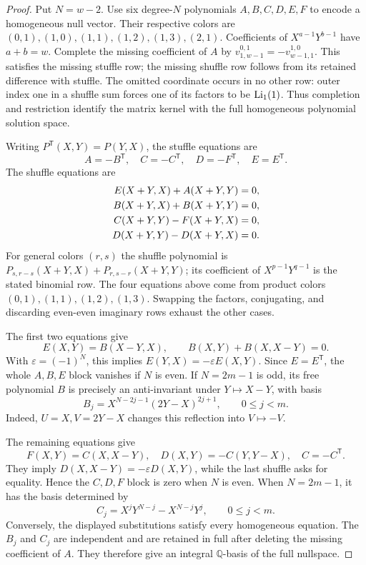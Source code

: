 \begin{proof}
Put $N=w-2$. Use six degree-$N$ polynomials $A,B,C,D,E,F$ to encode
a homogeneous null vector. Their respective colors are $(0,1),(1,0),(1,1),(1,2),(1,3),(2,1)$. Coefficients of $X^{a-1}Y^{b-1}$ have $a+b=w$.
Complete the missing coefficient of $A$ by
$v_{1,w-1}^{0,1}=-v_{w-1,1}^{1,0}$. This satisfies the missing stuffle row;
the missing shuffle row follows from its retained difference with stuffle.
The omitted coordinate occurs in no other row: outer index one in a
shuffle sum forces one of its factors to be $\operatorname{Li}_1(1)$.
Thus completion and restriction identify the matrix kernel with the full
homogeneous polynomial solution space.

Writing $P^{\mathsf T}(X,Y)=P(Y,X)$, the stuffle equations are
\begin{equation}\label{l4rank:eq:st}
 A=-B^{\mathsf T},\quad C=-C^{\mathsf T},\quad
 D=-F^{\mathsf T},\quad E=E^{\mathsf T}.
\end{equation}
The shuffle equations are
\begin{align}
 E(X+Y,X)+A(X+Y,Y)&=0,\notag\\
 B(X+Y,X)+B(X+Y,Y)&=0,\notag\\
 C(X+Y,Y)-F(X+Y,X)&=0,\notag\\
 D(X+Y,Y)-D(X+Y,X)&=0.\label{l4rank:eq:sh}
\end{align}
For general colors $(r,s)$ the shuffle polynomial is
$P_{s,r-s}(X+Y,X)+P_{r,s-r}(X+Y,Y)$; its coefficient of
$X^{p-1}Y^{q-1}$ is the stated binomial row. The four equations above come
from product colors $(0,1),(1,1),(1,2),(1,3)$. Swapping the factors,
conjugating, and discarding even-even imaginary rows exhaust the other cases.

The first two equations give
\[
 E(X,Y)=B(X-Y,X),\qquad B(X,Y)+B(X,X-Y)=0.
\]
With $\varepsilon=(-1)^N$, this implies
$E(Y,X)=-\varepsilon E(X,Y)$. Since $E=E^{\mathsf T}$, the whole $A,B,E$
block vanishes if $N$ is even. If $N=2m-1$ is odd, its free polynomial $B$
is precisely an anti-invariant under $Y\mapsto X-Y$, with basis
\begin{equation}\label{l4rank:eq:B-basis}
 B_j=X^{N-2j-1}(2Y-X)^{2j+1},\qquad 0\le j<m.
\end{equation}
Indeed, $U=X,V=2Y-X$ changes this reflection into $V\mapsto -V$.

The remaining equations give
\[
 F(X,Y)=C(X,X-Y),\quad D(X,Y)=-C(Y,Y-X),\quad C=-C^{\mathsf T}.
\]
They imply $D(X,X-Y)=-\varepsilon D(X,Y)$, while the last shuffle asks
for equality. Hence the $C,D,F$ block is zero when $N$ is even. When
$N=2m-1$, it has the basis determined by
\begin{equation}\label{l4rank:eq:C-basis}
 C_j=X^jY^{N-j}-X^{N-j}Y^j,\qquad 0\le j<m.
\end{equation}
Conversely, the displayed substitutions satisfy every homogeneous equation.
The $B_j$ and $C_j$ are independent and are retained in full after deleting
the missing coefficient of $A$. They therefore give an integral
$\mathbb Q$-basis of the full nullspace.


\end{proof}
